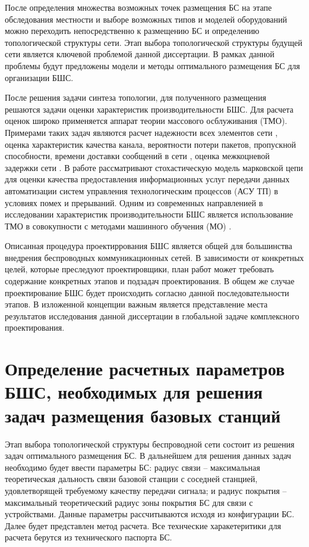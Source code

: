 После определения множества возможных точек размещения БС на этапе обследования местности и выборе возможных типов и моделей оборудований можно переходить непосредственно к размещению БС и определению топологической структуры сети. Этап выбора топологической структуры будущей сети является ключевой проблемой данной диссертации. В рамках данной проблемы будут предложены модели и методы оптимального размещения БС для организации БШС.

После решения задачи синтеза топологии, для полученного размещения решаются задачи оценки характеристик производительности БШС. Для расчета оценок широко применяется аппарат теории массового осблуживания (ТМО). Примерами таких задач являются расчет надежности всех элементов сети \cite{Wankpo2020, Krishnamoorthy2021, Kozyrev2019}, оценка характеристик качества канала, вероятности потери пакетов, пропускной способности, времени доставки сообщений в сети \cite{Gorbunova2020, Larionov2019, Vishnevsky2016_Methods_of_performance, Vishnevsky2016_Review_of_methodology, Wang2017, Sandmann2012, Baumann2017}, оценка межкоцневой задержки сети \cite{Wang2017, Sandmann2012}. В работе \cite{Eremenko2013} рассматривают стохастическую модель марковской цепи для оценки качества предоставления информационных услуг передачи данных автоматизации систем управления технологическим процессов (АСУ ТП) в условиях помех и прерываний. Одним из современных направленией в исследовании характеристик производительности БШС является использование ТМО в совокупности с методами машинного обучения (МО) \cite{Lovas2021, SatyaHermanto2018}.

Описанная процедура проектиррования БШС является общей для большинства внедрения беспроводных коммуникационных сетей. В зависимости от конкретных целей, которые преследуют проектировщики, план работ может требовать содержание конкретных этапов и подзадач проектирования. В общем же случае проектирование БШС будет происходить согласно данной последовательности этапов. В изложенной концепции важным является представление места результатов исследования данной диссертации в глобальной задаче комплексного проектирования.

\section{Определение расчетных параметров БШС, необходимых для решения задач размещения базовых станций}

Этап выбора топологической структуры беспроводной сети состоит из решения задач оптимального размещения БС. В дальнейшем для решения данных задач необходимо будет ввести параметры БС: радиус связи -- максимальная теоретическая дальность связи базовой станции с соседней станцией, удовлетворящей требуемому качеству передачи сигнала; и радиус покрытия -- максимальный теоретический радиус зоны покрытия БС для связи с устройствами. Данные параметры рассчитываются исходя из конфигурации БС. Далее будет представлен метод расчета. Все технческие харакетеритики для расчета берутся из технического паспорта БС.

